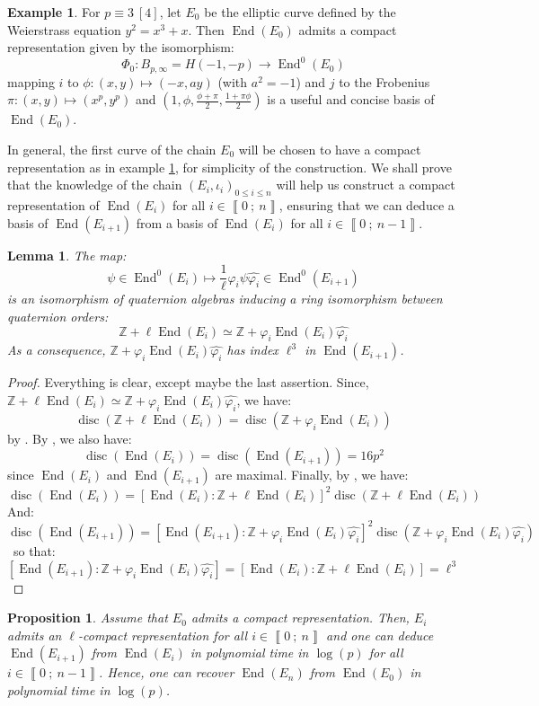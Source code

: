 \documentclass[a4paper,10pt]{report}
\theoremstyle{definition}
\theoremstyle{plain}
\newtheorem{proposition}[definition]{Proposition}
\newtheorem{lemma}[definition]{Lemma}
\theoremstyle{definition}
\newtheorem{example}[definition]{Example}
\newcommand{\Z}{\mathbb{Z}}
\renewcommand{\i}[2]{\left\llbracket #1~;~#2\right\rrbracket}
\renewcommand{\(}{\left(}
\renewcommand{\)}{\right)}
\DeclareMathOperator{\End}{End}
\DeclareMathOperator{\disc}{disc}
\begin{document}
\begin{example}\label{example 2}
For $p\equiv 3 \ [4]$, let $E_0$ be the elliptic curve defined by the Weierstrass equation $y^2=x^3+x$. Then $\End(E_0)$ admits a compact representation given by the isomorphism: 
\[\Phi_0 : B_{p,\infty}=H(-1,-p) \longrightarrow\End^0(E_0)\] 
mapping $i$ to $\phi : (x,y)\longmapsto (-x,ay)$ (with $a^2=-1$) and $j$ to the Frobenius $\pi : (x,y)\longmapsto (x^p,y^p)$ and $\(1, \phi,\frac{\phi+\pi}{2},\frac{1+\pi\phi}{2}\)$ is a useful and concise basis of $\End(E_0)$.
\end{example}

In general, the first curve of the chain $E_0$ will be chosen to have a compact representation as in example \ref{example 2}, for simplicity of the construction. We shall prove that the knowledge of the chain $(E_i,\iota_i)_{0\leq i\leq n}$ will help us construct a compact representation of $\End(E_i)$ for all $i\in\i{0}{n}$, ensuring that we can deduce a basis of $\End(E_{i+1})$ from a basis of $\End(E_i)$ for all $i\in\i{0}{n-1}$.

\begin{lemma}\label{lemma 3}
The map:
\[\psi\in\End^0(E_i)\longmapsto \frac{1}{\ell}\varphi_i\psi\widehat{\varphi_i}\in \End^0(E_{i+1})\]
is an isomorphism of quaternion algebras inducing a ring isomorphism between quaternion orders:
\[\Z+\ell\End(E_i)\simeq \Z+\varphi_i\End(E_i)\widehat{\varphi_i}\]
As a consequence, $\Z+\varphi_i\End(E_i)\widehat{\varphi_i}$ has index $\ell^3$ in $\End(E_{i+1})$.
\end{lemma}

\begin{proof}
Everything is clear, except maybe the last assertion.  Since, $\Z+\ell\End(E_i)\simeq \Z+\varphi_i\End(E_i)\widehat{\varphi_i}$, we have:
\[\disc(\Z+\ell\End(E_i))=\disc(\Z+\varphi_i\End(E_i))\]
by \cite[corollary 15.2.9]{Voight}. By \cite[theorem 15.5.5]{Voight}, we also have:
\[\disc(\End(E_i))=\disc(\End(E_{i+1}))=16p^2\]
since $\End(E_i)$ and $\End(E_{i+1})$ are maximal. Finally, by \cite[lemma 15.2.15]{Voight}, we have:
\[\disc(\End(E_i))=[\End(E_i):\Z+\ell\End(E_i)]^2\disc(\Z+\ell\End(E_i))\]
And:
\[\disc(\End(E_{i+1}))=[\End(E_{i+1}):\Z+\varphi_i\End(E_i)\widehat{\varphi_i}]^2\disc(\Z+\varphi_i\End(E_i)\widehat{\varphi_i})\]\
so that:
\[[\End(E_{i+1}):\Z+\varphi_i\End(E_i)\widehat{\varphi_i}]=[\End(E_i):\Z+\ell\End(E_i)]=\ell^3\]
\end{proof}

\begin{proposition}
Assume that $E_0$ admits a compact representation.  Then, $E_i$ admits an $\ell$-compact representation for all $i\in\i{0}{n}$ and one can deduce $\End(E_{i+1})$ from $\End(E_i)$ in polynomial time in $\log(p)$ for all $i\in\i{0}{n-1}$. Hence, one can recover $\End(E_n)$ from $\End(E_0)$ in polynomial time in $\log(p)$.
\end{proposition}
\end{document}
